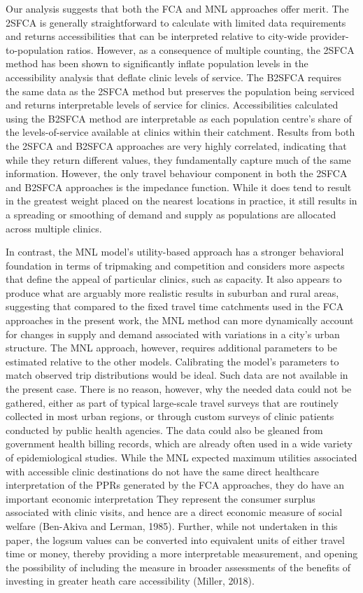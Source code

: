 \documentclass[]{elsarticle} %
\begin{document}
Our analysis suggests that both the FCA and MNL approaches offer merit.
The 2SFCA is generally straightforward to calculate with limited data
requirements and returns accessibilities that can be interpreted
relative to city-wide provider-to-population ratios. However, as a
consequence of multiple counting, the 2SFCA method has been shown to
significantly inflate population levels in the accessibility analysis
that deflate clinic levels of service. The B2SFCA requires the same data
as the 2SFCA method but preserves the population being serviced and
returns interpretable levels of service for clinics. Accessibilities
calculated using the B2SFCA method are interpretable as each population
centre's share of the levels-of-service available at clinics within
their catchment. Results from both the 2SFCA and B2SFCA approaches are
very highly correlated, indicating that while they return different
values, they fundamentally capture much of the same information.
However, the only travel behaviour component in both the 2SFCA and
B2SFCA approaches is the impedance function. While it does tend to
result in the greatest weight placed on the nearest locations in
practice, it still results in a spreading or smoothing of demand and
supply as populations are allocated across multiple clinics.

In contrast, the MNL model's utility-based approach has a stronger
behavioral foundation in terms of tripmaking and competition and
considers more aspects that define the appeal of particular clinics,
such as capacity. It also appears to produce what are arguably more
realistic results in suburban and rural areas, suggesting that compared
to the fixed travel time catchments used in the FCA approaches in the
present work, the MNL method can more dynamically account for changes in
supply and demand associated with variations in a city's urban
structure. The MNL approach, however, requires additional parameters to
be estimated relative to the other models. Calibrating the model's
parameters to match observed trip distributions would be ideal. Such
data are not available in the present case. There is no reason, however,
why the needed data could not be gathered, either as part of typical
large-scale travel surveys that are routinely collected in most urban
regions, or through custom surveys of clinic patients conducted by
public health agencies. The data could also be gleaned from government
health billing records, which are already often used in a wide variety
of epidemiological studies. While the MNL expected maximum utilities
associated with accessible clinic destinations do not have the same
direct healthcare interpretation of the PPRs generated by the FCA
approaches, they do have an important economic interpretation They
represent the consumer surplus associated with clinic visits, and hence
are a direct economic measure of social welfare (Ben-Akiva and Lerman,
1985). Further, while not undertaken in this paper, the logsum values
can be converted into equivalent units of either travel time or money,
thereby providing a more interpretable measurement, and opening the
possibility of including the measure in broader assessments of the
benefits of investing in greater heath care accessibility (Miller,
2018).
\end{document}
